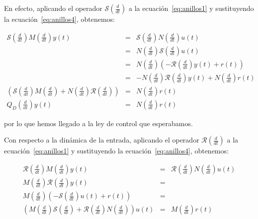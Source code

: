             En efecto, aplicando el operador $\mathcal{S} \left( \frac{d}{dt} \right)$ a la ecuación~\ref{eq:anillos1} y sustituyendo la ecuación~\ref{eq:anillos4}, obtenemos:

            \begin{eqnarray*}
                \mathcal{S} \left( \frac{d}{dt} \right) M \left( \frac{d}{dt} \right) y(t) & = & \mathcal{S} \left( \frac{d}{dt} \right) N \left( \frac{d}{dt} \right) u(t) \\
                & = & N \left( \frac{d}{dt} \right) \mathcal{S} \left( \frac{d}{dt} \right) u(t) \\
                & = & N \left( \frac{d}{dt} \right) \left( -\mathcal{R} \left( \frac{d}{dt} \right) y(t) + r(t) \right) \\
                & = & -N \left( \frac{d}{dt} \right) \mathcal{R} \left( \frac{d}{dt} \right) y(t) + N \left( \frac{d}{dt} \right) r(t) \\
                \left( \mathcal{S} \left( \frac{d}{dt} \right) M \left( \frac{d}{dt} \right) + N \left( \frac{d}{dt} \right) \mathcal{R} \left( \frac{d}{dt} \right) \right) & = & N \left( \frac{d}{dt} \right) r(t) \\
                Q_D \left( \frac{d}{dt} \right) y(t) & = & N \left( \frac{d}{dt} \right) r(t)
            \end{eqnarray*}

            por lo que hemos llegado a la ley de control que esperabamos.

            Con respecto a la dinámica de la entrada, aplicando el operador $\mathcal{R}\left( \frac{d}{dt} \right)$ a la ecuación~\ref{eq:anillos1} y sustituyendo la ecuación~\ref{eq:anillos4}, obtenemos:

            \begin{eqnarray*}
                \mathcal{R} \left( \frac{d}{dt} \right) M \left( \frac{d}{dt} \right) y(t) & = & \mathcal{R} \left( \frac{d}{dt} \right) N \left( \frac{d}{dt} \right) u(t) \\
                M \left( \frac{d}{dt} \right) \mathcal{R} \left( \frac{d}{dt} \right) y(t) & = & \\
                M \left( \frac{d}{dt} \right) \left( -\mathcal{S} \left( \frac{d}{dt} \right) u(t) + r(t) \right) & = & \\
                \left( M \left( \frac{d}{dt} \right) \mathcal{S} \left( \frac{d}{dt} \right) + \mathcal{R} \left( \frac{d}{dt} \right) N \left( \frac{d}{dt} \right) \right) u(t) & = & M \left( \frac{d}{dt} \right) r(t)
            \end{eqnarray*}

